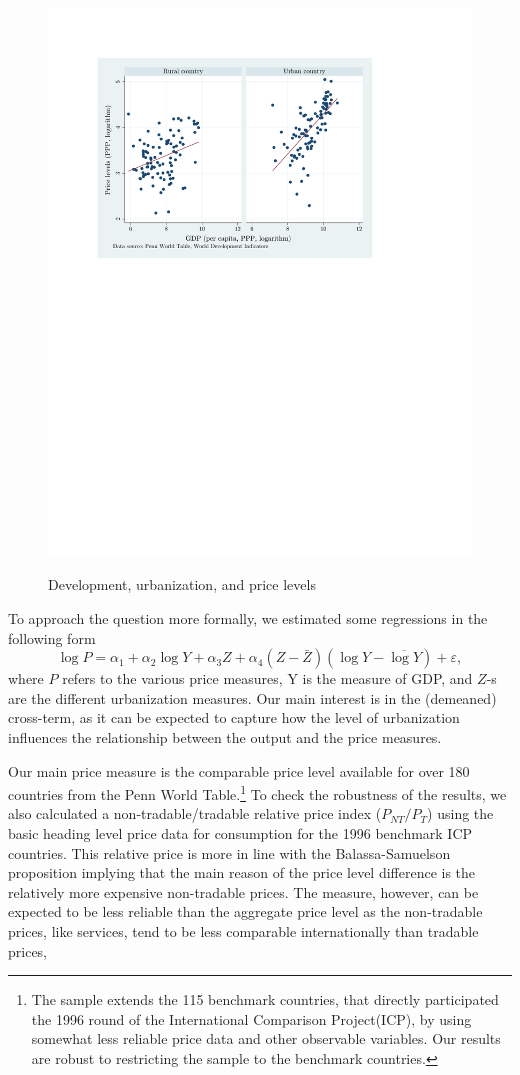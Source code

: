\documentclass[12pt]{article}
\begin{document}
\begin{figure}[h!]
\centering
  \includegraphics[width=0.7\linewidth]{figures/sc_penn}\\
  \caption{Development, urbanization, and price levels}\label{fig:pennX}
\end{figure}


To approach the question more formally, we estimated some
regressions in the following form
\begin{equation}
\log{P}=\alpha_1+\alpha_2\log Y+\alpha_3Z+\alpha_4(Z-\bar{Z})(\log Y-\overline{\log Y})+\varepsilon,
\end{equation}
where $P$ refers to the various price measures, Y is the measure of
GDP, and $Z$-s are the different urbanization measures. Our main
interest is in the (demeaned) cross-term, as it can be expected to
capture how the level of urbanization influences the relationship
between the output and the price measures.

Our main price measure is the comparable price level available for
over 180 countries from the Penn World Table.\footnote{The sample
extends the 115 benchmark countries, that directly participated the
1996 round of the International Comparison Project(ICP), by using
somewhat less reliable price data and other observable variables.
Our results are robust to restricting the sample to the benchmark
countries.} To check the robustness of the results, we also
calculated a non-tradable/tradable relative price index
($P_{NT}/P_{T}$) using the basic heading level price data for
consumption for the 1996 benchmark ICP countries. This relative
price is more in line with the Balassa-Samuelson proposition
implying that the main reason of the price level difference is the
relatively more expensive non-tradable prices. The measure, however,
can be expected to be less reliable than the aggregate price level
as the non-tradable prices, like services, tend to be less
comparable internationally than tradable prices,
\end{document}
